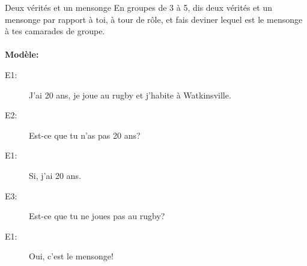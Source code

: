 \begin{frame}{Deux vérités et un mensonge }
  En groupes de 3 à 5, dis deux vérités et un mensonge par rapport à toi, à tour de rôle, et fais deviner lequel est le mensonge à tes camarades de groupe. \\
   \\
  \textbf{Modèle:} \\
  \begin{description}
    \item[E1:] J'ai 20 ans, je joue au rugby et j'habite à Watkinsville.
    \item[] 
    \item[E2:] Est-ce que tu n'as pas 20 ans?
    \item[] 
    \item[E1:] Si, j'ai 20 ans.
    \item[] 
    \item[E3:] Est-ce que tu ne joues pas au rugby?
    \item[] 
    \item[E1:] Oui, c'est le mensonge!
    \item[] 
  \end{description}
\end{frame}